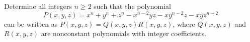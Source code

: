 Determine all integers $n\geq 2$ such that the polynomial
\[
P(x,y,z)=x^n+y^n+z^n-x^{n-2}yz-xy^{n-2}z-xyz^{n-2}
\]
can be written as $P(x,y,z)=Q(x,y,z)R(x,y,z)$, where $Q(x,y,z)$ and $R(x,y,z)$ are nonconstant polynomials with integer coefficients.
